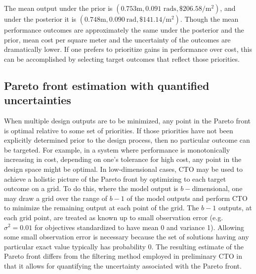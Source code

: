 \documentclass[twocolumn,10pt]{asme2ej}
\begin{document}
The mean output under the prior is $(0.753\mathrm m,0.091\text{ rads},\$206.58/\mathrm m^2)$, and under the posterior it is $(0.748\mathrm m,0.090\ \mathrm{rad},\$141.14/\mathrm m^2)$.
%
Though the mean performance outcomes are approximately the same under the posterior and the prior, mean cost per square meter and the uncertainty of the outcomes are dramatically lower.
%
If one prefers to prioritize gains in performance over cost, this can be accomplished by selecting target outcomes that reflect those priorities.
%

%
\subsection{Pareto front estimation with quantified uncertainties}\label{removing_cal_pars}


%
When multiple design outputs are to be minimized, any point in the Pareto front is optimal relative to some set of priorities.
%
If those priorities have not been explicitly determined prior to the design process, then no particular outcome can be targeted.
%
%
For example, in a system where performance is monotonically increasing in cost, depending on one's tolerance for high cost, any point in the design space might be optimal.
%
%
In low-dimensional cases, CTO may be used to achieve a holistic picture of the Pareto front by optimizing to each target outcome on a grid.
%
To do this, where the model output is $b-$dimensional, one may draw a grid over the range of $b-1$ of the model outputs and perform CTO to minimize the remaining output at each point of the grid.
%
The $b-1$ outputs, at each grid point, are treated as known up to small observation error (e.g. $\sigma^2=0.01$ for objectives standardized to have mean 0 and variance 1).
%
Allowing some small observation error is necessary because the set of solutions having any particular exact value typically has probability 0.
%
The resulting estimate of the Pareto front differs from the filtering method employed in preliminary CTO in that it allows for quantifying the uncertainty associated with the Pareto front.
%
\end{document}
